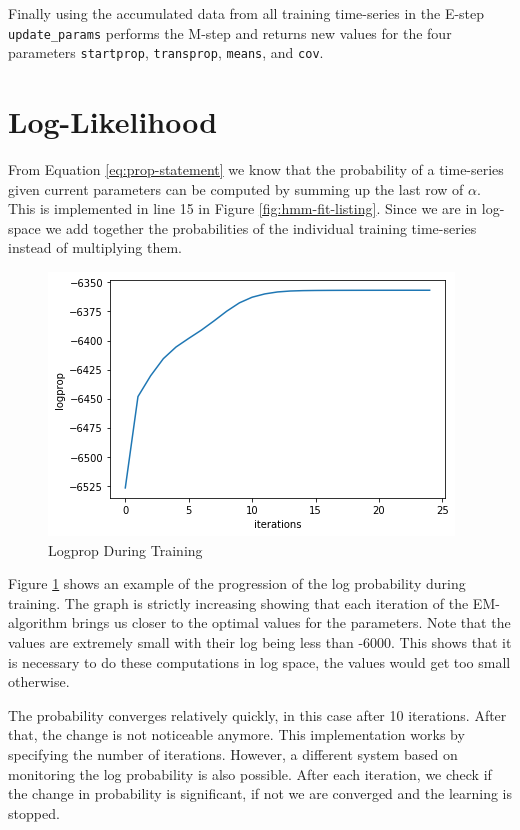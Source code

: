 Finally using the accumulated data from all training time-series in the E-step \texttt{update\_params} performs the M-step and returns new values for the four parameters \texttt{startprop}, \texttt{transprop}, \texttt{means}, and \texttt{cov}.

\section{Log-Likelihood}

From Equation \eqref{eq:prop-statement} we know that the probability of a time-series given current parameters can be computed by summing up the last row of $\alpha$. This is implemented in line 15 in Figure \ref{fig:hmm-fit-listing}. Since we are in log-space we add together the probabilities of the individual training time-series instead of multiplying them.

\begin{figure}
   \includegraphics{figures/logprop.png}
   \caption{Logprop During Training}
      
   \label{fig:lopprop-graph}
\end{figure}

Figure \ref{fig:lopprop-graph} shows an example of the progression of the log probability during training. The graph is strictly increasing showing that each iteration of the EM-algorithm brings us closer to the optimal values for the parameters. Note that the values are extremely small with their log being less than -6000. This shows that it is necessary to do these computations in log space, the values would get too small otherwise. 

The probability converges relatively quickly, in this case after 10 iterations. After that, the change is not noticeable anymore. This implementation works by specifying the number of iterations. However, a different system based on monitoring the log probability is also possible. After each iteration, we check if the change in probability is significant, if not we are converged and the learning is stopped.

